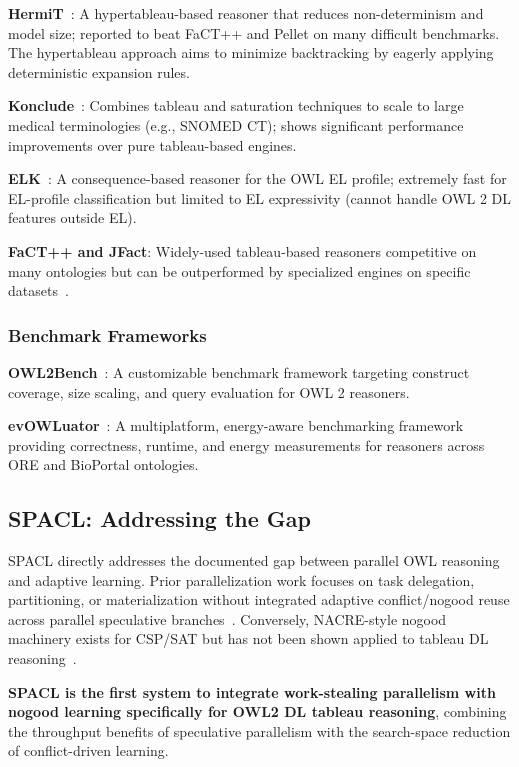 \textbf{HermiT}~\cite{glimm2014hermit}: A hypertableau-based reasoner that reduces non-determinism and model size; reported to beat FaCT++ and Pellet on many difficult benchmarks. The hypertableau approach aims to minimize backtracking by eagerly applying deterministic expansion rules.

\textbf{Konclude}~\cite{song2013complete,glimm2014coupling}: Combines tableau and saturation techniques to scale to large medical terminologies (e.g., SNOMED CT); shows significant performance improvements over pure tableau-based engines.

\textbf{ELK}~\cite{bate2018consequence}: A consequence-based reasoner for the OWL EL profile; extremely fast for EL-profile classification but limited to EL expressivity (cannot handle OWL 2 DL features outside EL).

\textbf{FaCT++ and JFact}: Widely-used tableau-based reasoners competitive on many ontologies but can be outperformed by specialized engines on specific datasets~\cite{kang2012rigorous,glimm2014hermit}.

\subsubsection{Benchmark Frameworks}

\textbf{OWL2Bench}~\cite{singh2020owl2bench}: A customizable benchmark framework targeting construct coverage, size scaling, and query evaluation for OWL 2 reasoners.

\textbf{evOWLuator}~\cite{bilenchi2021multiplatform}: A multiplatform, energy-aware benchmarking framework providing correctness, runtime, and energy measurements for reasoners across ORE and BioPortal ontologies.

\subsection{SPACL: Addressing the Gap}

SPACL directly addresses the documented gap between parallel OWL reasoning and adaptive learning. Prior parallelization work focuses on task delegation, partitioning, or materialization without integrated adaptive conflict/nogood reuse across parallel speculative branches~\cite{quan2017parallel,quan2019framework,liu2017spowl,gu2015cichlid}. Conversely, NACRE-style nogood machinery exists for CSP/SAT but has not been shown applied to tableau DL reasoning~\cite{glorian2020nacre}.

\textbf{SPACL is the first system to integrate work-stealing parallelism with nogood learning specifically for OWL2 DL tableau reasoning}, combining the throughput benefits of speculative parallelism with the search-space reduction of conflict-driven learning.

